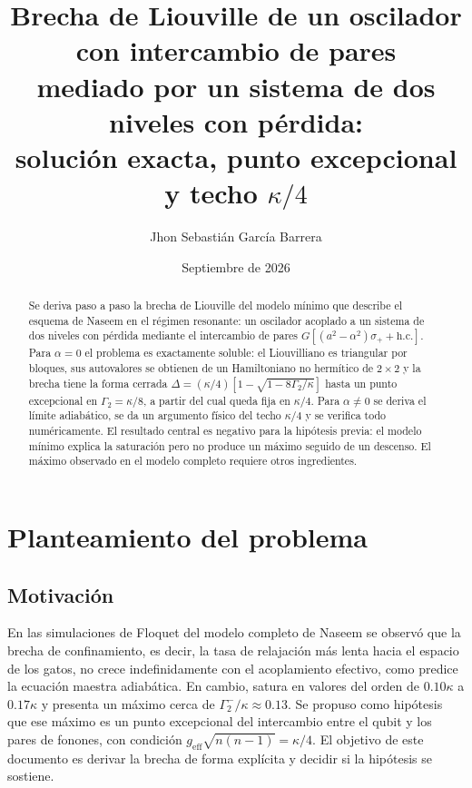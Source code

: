 \documentclass[11pt]{report}
\title{Brecha de Liouville de un oscilador con intercambio de pares\\ mediado por un sistema de dos niveles con p\'erdida:\\ soluci\'on exacta, punto excepcional y techo $\kappa/4$}
\author{Jhon Sebasti\'an Garc\'ia Barrera}
\date{Septiembre de 2026}
\begin{document}
\maketitle

\begin{abstract}
Se deriva paso a paso la brecha de Liouville del modelo m\'inimo que describe el esquema de Naseem en el r\'egimen resonante: un oscilador acoplado a un sistema de dos niveles con p\'erdida mediante el intercambio de pares $G[(a^{2}-\alpha^{2})\sigma_{+}+\mathrm{h.c.}]$. Para $\alpha=0$ el problema es exactamente soluble: el Liouvilliano es triangular por bloques, sus autovalores se obtienen de un Hamiltoniano no herm\'itico de $2\times 2$ y la brecha tiene la forma cerrada $\Delta=(\kappa/4)[1-\sqrt{1-8\Gamma_{2}/\kappa}]$ hasta un punto excepcional en $\Gamma_{2}=\kappa/8$, a partir del cual queda fija en $\kappa/4$. Para $\alpha\neq 0$ se deriva el l\'imite adiab\'atico, se da un argumento f\'isico del techo $\kappa/4$ y se verifica todo num\'ericamente. El resultado central es negativo para la hip\'otesis previa: el modelo m\'inimo explica la saturaci\'on pero no produce un m\'aximo seguido de un descenso. El m\'aximo observado en el modelo completo requiere otros ingredientes.
\end{abstract}

\section{Planteamiento del problema}

\subsection{Motivaci\'on}

En las simulaciones de Floquet del modelo completo de Naseem \cite{Naseem2026} se observ\'o que la brecha de confinamiento, es decir, la tasa de relajaci\'on m\'as lenta hacia el espacio de los gatos, no crece indefinidamente con el acoplamiento efectivo, como predice la ecuaci\'on maestra adiab\'atica. En cambio, satura en valores del orden de $0.10\kappa$ a $0.17\kappa$ y presenta un m\'aximo cerca de $\Gamma_{2}^{-}/\kappa\approx 0.13$. Se propuso como hip\'otesis que ese m\'aximo es un punto excepcional del intercambio entre el qubit y los pares de fonones, con condici\'on $g_{\mathrm{eff}}\sqrt{n(n-1)}=\kappa/4$. El objetivo de este documento es derivar la brecha de forma expl\'icita y decidir si la hip\'otesis se sostiene.
\end{document}
